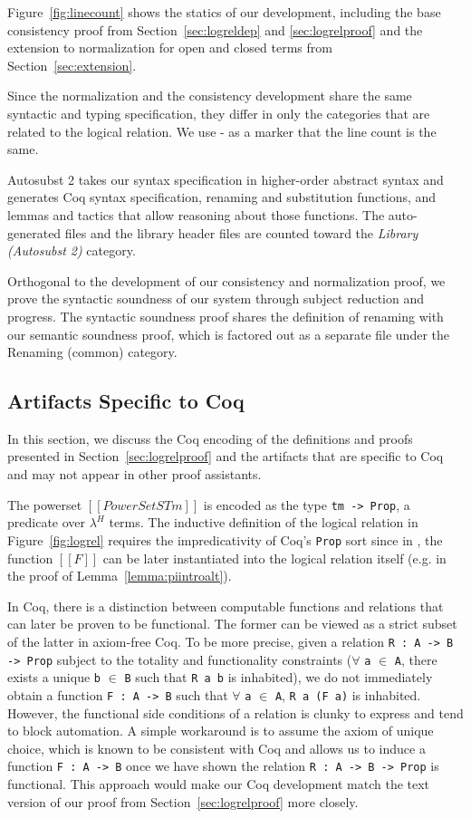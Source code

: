 \documentclass[acmsmall,screen=true,
\ifpublic review=false\else,review=true\fi
  ,anonymous=\ifanonymous true\else false\fi]{acmart}
\newcommand{\lang}{$\lambda^H$\xspace}
\newcommand{\scw}[1]{}
\begin{document}
Figure~\ref{fig:linecount} shows the statics of our
development, including the base consistency proof from
Section~\ref{sec:logreldep} and \ref{sec:logrelproof} and the
extension to normalization for open and closed terms from
Section~\ref{sec:extension}.

Since the normalization and the consistency development share the same
syntactic and typing specification, they differ in only the categories
that are related to the logical relation. We use - as a marker that
the line count is the same.

Autosubst 2 takes our syntax specification in higher-order abstract
syntax and generates Coq syntax specification, renaming and
substitution functions, and lemmas and tactics that allow reasoning
about those functions. The auto-generated files and the library header
files are counted toward the \emph{Library (Autosubst 2)} category.

Orthogonal to the development of our consistency and normalization
proof, we prove the syntactic soundness of our system through subject
reduction and progress. The syntactic soundness proof shares the
definition of renaming with our semantic soundness proof, which is
factored out as a separate file under the Renaming (common) category.

\subsection{Artifacts Specific to Coq}
In this section, we discuss the Coq encoding of the definitions and proofs presented
in Section~\ref{sec:logrelproof}  and the artifacts that are
specific to Coq and may not appear in other proof assistants.

The powerset $[[PowerSet STm]]$ is encoded as the type \texttt{tm ->
Prop}, a predicate over \lang{} terms.
The inductive
definition of the logical relation in Figure~\ref{fig:logrel} requires
the impredicativity of Coq's \texttt{Prop} sort since\scw{or ``so that''?} in ,
the function $[[F]]$ can be later instantiated into the logical
relation itself (e.g. in the proof of Lemma~\ref{lemma:piintroalt}).

In Coq, there is a distinction between computable functions and
relations that can later be proven to be functional. The former can be
viewed as a strict subset of the latter in axiom-free Coq. To be more
precise, given a relation \texttt{R : A -> B -> Prop} subject to the
totality and functionality constraints ($\forall$ \texttt{a} $\in$
\texttt{A}, there exists a unique \texttt{b} $\in$ \texttt{B} such
that \texttt{R a b} is inhabited), we do not immediately obtain a function
\texttt{F : A -> B} such that $\forall$ \texttt{a} $\in$ \texttt{A},
\texttt{R a (F a)} is inhabited. However, the functional side
conditions of a relation is clunky to express and tend to block
automation. A simple workaround is to assume the axiom of unique choice, which
is known to be consistent with Coq and allows us to induce a function \texttt{F
: A -> B} once we have shown the relation \texttt{R : A -> B -> Prop}
is functional. This approach would make our Coq development match
the text version of our proof from Section~\ref{sec:logrelproof} more
closely.
\end{document}
